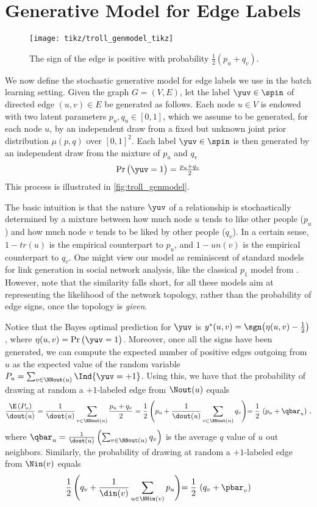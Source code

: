 \section{Generative Model for Edge Labels}\label{s:gen}

\begin{wrapfigure}[8]{o}[10mm]{50mm}
	\centering
	\texttt{[image: tikz/troll\_genmodel\_tikz]}
	\caption{\small The sign \yuv{} of the edge \euv{} is positive with probability $\frac{1}{2}(p_u+q_v)$.
	\label{fig:troll_genmodel}}
\end{wrapfigure}
We now define the stochastic generative model for edge labels we use in the batch learning setting.
Given the graph $G = (V,E)$, let the label $\yuv \in \spin$ of directed edge $(u,v) \in E$ be%
generated as follows. Each node $u \in V$ is endowed with two latent parameters $p_u, q_u \in
[0,1]$, which we assume to be generated, for each node $u$, by an independent draw from a fixed but
unknown joint prior distribution $\mu(p,q)$ over $[0,1]^2$. Each label $\yuv \in \spin$ is then
generated by an independent draw from the mixture of $p_u$ and $q_v$
$$\Pr\big( \yuv = 1 \big) = \tfrac{p_u + q_v}{2}$$
This process is illustrated in \autoref{fig:troll_genmodel}.

The basic intuition is that the nature $\yuv$ of a relationship \euv{} is stochastically
determined by a mixture between how much node $u$ tends to like other people ($p_u$) and how much
node $v$ tends to be liked by other people ($q_v$). In a certain sense, $1-tr(u)$ is the empirical
counterpart to $p_u$, and $1-un(v)$ is the empirical counterpart to $q_v$. One might view
our model as reminiscent of standard models for link generation in social network analysis, like the
classical $p_1$ model from \cite{hl81}. However, note that the similarity falls short, for all these
models aim at
representing the likelihood of the network topology, rather than the probability of edge signs, once
the topology is \emph{given}.

Notice that the Bayes optimal prediction for $\yuv$ is $y^*(u,v) = \sgn\big(\eta(u,v) -
\tfrac{1}{2}\big)$, where $\eta(u,v) = \Pr\big( \yuv = 1 \big)$. Moreover, once all the signs have
been generated, we can compute the expected number of positive edges outgoing from $u$ as the
expected value of the random variable $P_u = \sum_{v\in \NNout(u)} \Ind{\yuv = +1}$. Using this, we
have that the probability of
drawing at random a $+1$-labeled edge from $\Nout(u)$ equals
\begin{equation}\label{e:pout}
	\frac{\E\left(P_u\right)}{\dout(u)} =
	\frac{1}{\dout(u)} \sum_{v\in \NNout(u)} \frac{p_u + q_v}{2} =
	\frac{1}{2}\,\Biggl(p_u + \frac{1}{\dout(u)} \sum_{v\in \NNout(u)} q_v \Biggl) =
		\frac{1}{2}\,\left(p_u + \qbar_u\right)\,,
\end{equation}
where $\qbar_u = \frac{1}{\dout(u)} \left( \sum_{v\in \NNout(u)} q_v \right)$ is the average $q$
value of $u$ out neighbors.
Similarly, the probability of drawing at random a $+1$-labeled edge from $\Nin(v)$ equals
\begin{equation}\label{e:pin}
	\frac{1}{2}\,\Biggl(q_v + \frac{1}{\din(v)} \sum_{u\in \NNin(v)} p_u \Biggl)=
		\frac{1}{2}\,\left(q_v + \pbar_v\right)
\end{equation}
